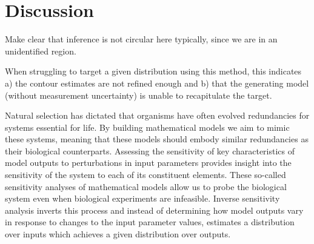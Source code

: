 \documentclass[10pt,letterpaper]{article}
\begin{document}
\section{Discussion}
\label{sec:discussion}

Make clear that inference is not circular here typically, since we are in an unidentified region.

When struggling to target a given distribution using this method, this indicates a) the contour estimates are not refined enough and b) that the generating model (without measurement uncertainty) is unable to recapitulate the target.

Natural selection has dictated that organisms have often evolved redundancies for systems essential for life. By building mathematical models we aim to mimic these systems, meaning that these models should embody similar redundancies as their biological counterparts. Assessing the sensitivity of key characteristics of model outputs to perturbations in input parameters provides insight into the sensitivity of the system to each of its constituent elements. These so-called sensitivity analyses of mathematical models allow us to probe the biological system even when biological experiments are infeasible. Inverse sensitivity analysis inverts this process and instead of determining how model outputs vary in response to changes to the input parameter values, estimates a distribution over inputs which achieves a given distribution over outputs.
\end{document}
